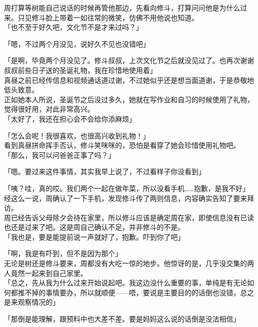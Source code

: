 周打算等树能自己说话的时候再管他那边，先看向修斗，打算问问他是为什么过来。只见修斗脸上带着一如往常的微笑，仿佛不用他说也知道。\\

「也不至于好久吧，文化节不是才来过吗？」

「嗯，不过两个月没见，说好久不见也没错吧」

「是啊，毕竟两个月没见了。修斗叔叔，上次文化节之后就没见过了。也再次谢谢叔叔前些日子送的圣诞礼物，我在珍惜地使用着」\\

真昼之前已经传信息和视频通话道过谢，不过她似乎还是想当面道谢，于是恭敬地低头致意。\\

正如她本人所说，圣诞节之后没过多久，她就在写作业和自习的时候使用了礼物，觉得很好用，对此非常高兴。\\

%
「太好了，我还在担心会不会给你添麻烦」


「怎么会呢！我很喜欢，也很高兴收到礼物！」\\

看到真昼拼命挥手否认，修斗笑咪咪的，恐怕是看穿了她会珍惜使用礼物吧。\\

「那么，我可以问爸爸正事了吗？」

「嗯。要过来这件事情，其实我早上说了，不过看样子你没看到」

「咦？哇，真的哎。我们两个一起在做年菜，所以没看手机……抱歉，是我不好」\\

经这么一说，周确认了一下手机，发现修斗传了两则信息，内容确实告知了要来拜访。\\

周已经告诉父母除夕会待在家里，所以修斗应该是确定周在家，即使信息没有已读也还是过来了吧。这是周自己确认不足，并非修斗的不是。\\

「我也是，要是能提前说一声就好了，抱歉。吓到你了吧」

「啊，我是有吓到，但不是因为那个」\\

无论是树还是修斗要来，周都没有大吃一惊的地步。他惊讶的是，几乎没交集的两人竟然一起来到自己家里。\\

「总之，先从我为什么过来开始说起吧。我这边没什么重要的事，单纯是有无论如何都推不掉的事情要办，所以就顺便——唔，要说是主要目的的话倒也没错，总之是来观察情况的」

「那倒是能理解，跟预料中也大差不差。要是妈妈这么说的话倒是没法相信」\\

